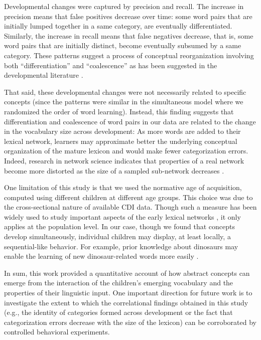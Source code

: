 \documentclass[11pt]{article}
\begin{document}
Developmental changes were captured by precision and recall. The
increase in precision means that false positives decrease over time:
some word pairs that are initially lumped together in a same category,
are eventually differentiated. Similarly, the increase in recall means
that false negatives decrease, that is, some word pairs that are
initially distinct, become eventually subsumed by a same category. These
patterns suggest a process of conceptual reorganization involving both
``differentiation'' and ``coalescence'' as has been suggested in the
developmental literature \cite{carey2009}.

That said, these developmental changes were not necessarily related to
specific concepts (since the patterns were similar in the simultaneous
model where we randomized the order of word learning). Instead, this
finding suggests that differentiation and coalescence of word pairs in
our data are related to the change in the vocabulary size across
development: As more words are added to their lexical network, learners
may approximate better the underlying conceptual organization of the
mature lexicon and would make fewer categorization errors. Indeed,
research in network science indicates that properties of a real network
become more distorted as the size of a sampled sub-network decreases
\cite{leskovec2006}.

One limitation of this study is that we used the normative age of
acquisition, computed using different children at different age groups.
This choice was due to the cross-sectional nature of available CDI data.
Though such a measure has been widely used to study important aspects of
the early lexical networks \cite{hills2009,stella2017,storkel2009}, it
only applies at the population level. In our case, though we found that
concepts develop simultaneously, individual children may display, at
least locally, a sequential-like behavior. For example, prior knowledge
about dinosaurs may enable the learning of new dinosaur-related words
more easily \cite{chi1983}.

In sum, this work provided a quantitative account of how abstract
concepts can emerge from the interaction of the children's emerging
vocabulary and the properties of their linguistic input. One important
direction for future work is to investigate the extent to which the
correlational findings obtained in this study (e.g., the identity of
categories formed across development or the fact that categorization
errors decrease with the size of the lexicon) can be corroborated by
controlled behavioral experiments.

\vspace{1em}

\vspace{1em}



\end{document}
